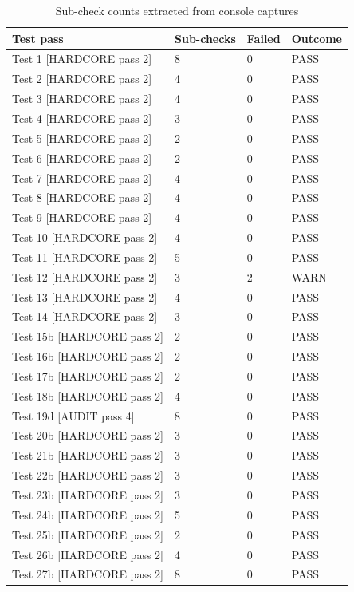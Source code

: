 \documentclass[10pt]{article}
\begin{document}
\begin{table}[htbp]
\centering
\small
\caption{Sub-check counts extracted from console captures}
\begin{tabular}{llll}
\toprule
\textbf{Test pass} & \textbf{Sub-checks} & \textbf{Failed} & \textbf{Outcome} \\
\midrule
Test 1 [HARDCORE pass 2] & 8 & 0 & PASS \\
Test 2 [HARDCORE pass 2] & 4 & 0 & PASS \\
Test 3 [HARDCORE pass 2] & 4 & 0 & PASS \\
Test 4 [HARDCORE pass 2] & 3 & 0 & PASS \\
Test 5 [HARDCORE pass 2] & 2 & 0 & PASS \\
Test 6 [HARDCORE pass 2] & 2 & 0 & PASS \\
Test 7 [HARDCORE pass 2] & 4 & 0 & PASS \\
Test 8 [HARDCORE pass 2] & 4 & 0 & PASS \\
Test 9 [HARDCORE pass 2] & 4 & 0 & PASS \\
Test 10 [HARDCORE pass 2] & 4 & 0 & PASS \\
Test 11 [HARDCORE pass 2] & 5 & 0 & PASS \\
Test 12 [HARDCORE pass 2] & 3 & 2 & WARN \\
Test 13 [HARDCORE pass 2] & 4 & 0 & PASS \\
Test 14 [HARDCORE pass 2] & 3 & 0 & PASS \\
Test 15b [HARDCORE pass 2] & 2 & 0 & PASS \\
Test 16b [HARDCORE pass 2] & 2 & 0 & PASS \\
Test 17b [HARDCORE pass 2] & 2 & 0 & PASS \\
Test 18b [HARDCORE pass 2] & 4 & 0 & PASS \\
Test 19d [AUDIT pass 4] & 8 & 0 & PASS \\
Test 20b [HARDCORE pass 2] & 3 & 0 & PASS \\
Test 21b [HARDCORE pass 2] & 3 & 0 & PASS \\
Test 22b [HARDCORE pass 2] & 3 & 0 & PASS \\
Test 23b [HARDCORE pass 2] & 3 & 0 & PASS \\
Test 24b [HARDCORE pass 2] & 5 & 0 & PASS \\
Test 25b [HARDCORE pass 2] & 2 & 0 & PASS \\
Test 26b [HARDCORE pass 2] & 4 & 0 & PASS \\
Test 27b [HARDCORE pass 2] & 8 & 0 & PASS \\

\end{tabular}
\end{table}
\end{document}

